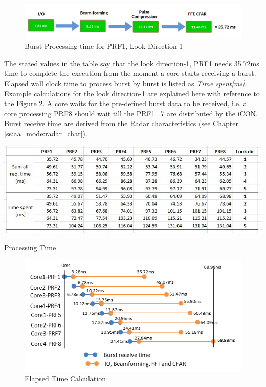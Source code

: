 \begin{figure}[h!]
	\centering
	\includegraphics[width=145mm]{figures/scheme3_req_time}
	\caption{Burst Processing time for PRF1, Look Direction-1}
	\label{fig:mm:scheme3_req_time}
\end{figure}

The stated values in the table say that the look direction-1, PRF1 needs 35.72ms time to complete the execution from the moment a core starts receiving a burst. Elapsed wall clock time to process burst by burst is listed as \textsl{Time spent[ms]}. Example calculations for the look direction-1 are explained here with reference to the Figure \ref{fig:mm:scheme4_timeline_burst_proc}. A core waits for the pre-defined burst data to be received, i.e. a core processing PRF8 should wait till the PRF1...7 are distributed by the iCON. Burst receive time are derived from the Radar characteristics (see Chapter \ref{ss:aa_mode:radar_char}).

\begin{table}[h!]
	\centering
	\includegraphics[width=140mm]{figures/scheme4_elapsed_time}
	\caption{Processing Time}
	\label{fig:mm:scheme4_elapsed_time}
\end{table}

\begin{figure}[h!]
	\centering
	\includegraphics[width=130mm]{figures/scheme4_timeline_burst_proc}
	\caption{Elapsed Time Calculation}
	\label{fig:mm:scheme4_timeline_burst_proc}
\end{figure}

